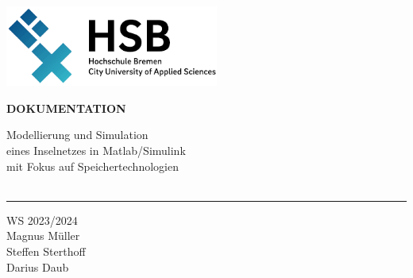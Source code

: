 \begin{titlepage}
    \color{haw}
    \raggedright
    \hfill\includegraphics[width=7cm]{HSB.png}\\
  
    \vspace{5cm}
  
    \setmainfont{Open Sans}
    \small
    \textbf{DOKUMENTATION}
  
    \vspace{8mm}
  
    \begin{minipage}{0.8\linewidth}
      \LARGE
      Modellierung und Simulation\\[1mm]
      eines Inselnetzes in Matlab/Simulink\\[1mm]
      mit Fokus auf Speichertechnologien\\[1mm]
      \,\rule{11mm}{1.2mm}
    \end{minipage}
  
    \vspace{1cm}
  
    WS 2023/2024\\
    Magnus Müller \\
    Steffen Sterthoff \\
    Darius Daub
  

\end{titlepage}
